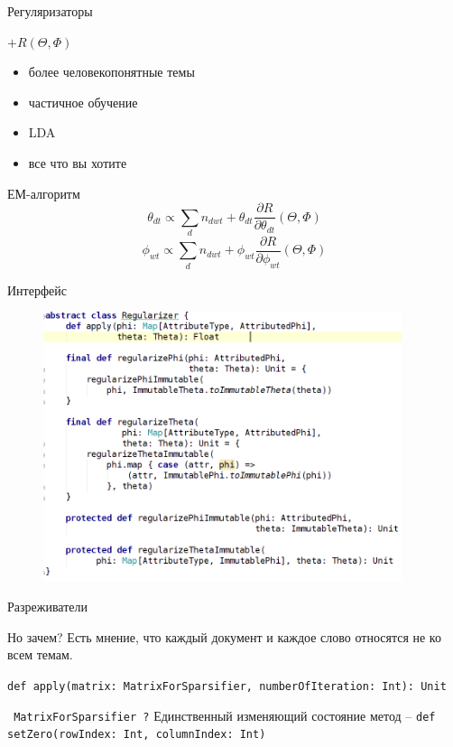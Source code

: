 \documentclass{beamer}
\begin{document}
\begin{frame}{Регуляризаторы}
    \begin{block}{$+R(\Theta, \Phi)$}
	\begin{itemize}
	    \item более человекопонятные темы
	    \item частичное обучение
	    \item LDA
	    \item все что вы хотите
	\end{itemize}
    \end{block}

    \begin{block}{ЕМ-алгоритм}
	$$ \theta_{dt} \propto\sum_d n_{dwt}   + \theta_{dt}\frac{\partial R}{\partial \theta_{dt}} (\Theta, \Phi) $$
	$$\phi_{wt} \propto \sum_d n_{dwt} + \phi_{wt}\frac{\partial R}{\partial \phi_{wt}} (\Theta, \Phi)$$
    \end{block}
\end{frame}

\begin{frame}{Интерфейс}
    \begin{figure}[ht!]
	\centering
	\includegraphics[width=105mm]{regularizer}
	\label{overflow}
    \end{figure}
\end{frame}


\begin{frame}{Разреживатели}
    \begin{block}{Но зачем?}
	Есть мнение, что каждый документ и каждое слово относятся не ко всем темам.

	\texttt{def apply(matrix: MatrixForSparsifier, numberOfIteration: Int): Unit}
    \end{block}

    \begin{block}{\texttt{ MatrixForSparsifier ?}}
	Единственный изменяющий состояние метод --
	\texttt{def setZero(rowIndex: Int, columnIndex: Int)}
    \end{block}
\end{frame}
\end{document}

